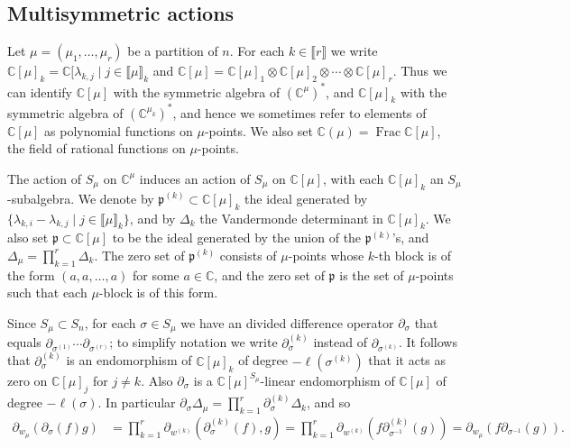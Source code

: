 \documentclass[11pt,fleqn]{article}
\newcommand\CC{\mathbb C}
\newcommand\ot{\otimes}
\newcommand\p{\mathfrak p}
\newcommand\interval[1]{\llbracket #1 \rrbracket}
\DeclareMathOperator\Frac{Frac}
\begin{document}
\subsection{Multisymmetric actions}
Let $\mu = (\mu_1, \ldots, \mu_r)$ be a partition of $n$. For each $k \in 
\interval r$ we write $\CC[\mu]_k = \CC[\lambda_{k,j} \mid j \in \interval 
\mu_k$ and $\CC[\mu] = \CC[\mu]_1 \ot \CC[\mu]_2 \ot \cdots \ot \CC[\mu]_r$. 
Thus we can identify $\CC[\mu]$ with the symmetric algebra of $(\CC^\mu)^*$, 
and $\CC[\mu]_k$ with the symmetric algebra of $(\CC^{\mu_k})^*$, and hence we 
sometimes refer to elements of $\CC[\mu]$ as polynomial functions on 
$\mu$-points. We also set $\CC(\mu) = \Frac \CC[\mu]$, the field of rational
functions on $\mu$-points.

The action of $S_\mu$ on $\CC^\mu$ induces an action of $S_\mu$ on $\CC[\mu]$, 
with each $\CC[\mu]_k$ an $S_\mu$-subalgebra. We denote by $\p^{(k)} \subset 
\CC[\mu]_k$ the ideal generated by $\{\lambda_{k,i} - \lambda_{k,j} \mid 
j \in \interval \mu_k\}$, and by $\Delta_k$ the Vandermonde determinant in 
$\CC[\mu]_k$. We also set $\p \subset \CC[\mu]$ to be the ideal generated by 
the union of the $\p^{(k)}$'s, and $\Delta_\mu = \prod_{k=1}^r \Delta_k$. The 
zero set of $\p^{(k)}$ consists of $\mu$-points whose $k$-th block is of the 
form $(a,a, \ldots, a)$ for some $a \in \CC$, and the zero set of $\p$ is the 
set of $\mu$-points such that each $\mu$-block is of this form. 

Since $S_\mu \subset S_n$, for each $\sigma \in S_\mu$ we have an divided 
difference operator $\partial_\sigma$ that equals $\partial_{\sigma^{(1)}} 
\cdots \partial_{\sigma^{(r)}}$; to simplify notation we write 
$\partial_\sigma^{(k)}$ instead of $\partial_{\sigma^{(k)}}$. It follows that 
$\partial_\sigma^{(k)}$ is an endomorphism of $\CC[\mu]_k$ of degree 
$-\ell(\sigma^{(k)})$ that it acts as zero on $\CC[\mu]_j$ for $j \neq k$. 
Also $\partial_\sigma$ is a $\CC[\mu]^{S_\mu}$-linear endomorphism of 
$\CC[\mu]$ of degree $-\ell(\sigma)$. In particular $\partial_\sigma 
\Delta_\mu = \prod_{k=1}^r \partial_{\sigma}^{(k)} \Delta_k$, and so 
\begin{align*}
\partial_{w_\mu}(\partial_\sigma(f) g) 
  &= \prod_{k=1}^r \partial_{w^{(k)}} (\partial_{\sigma}^{(k)}(f), g)
  = \prod_{k=1}^r \partial_{w^{(k)}} (f \partial_{\sigma^{-1}}^{(k)}(g)) 
  = \partial_{w_\mu} (f \partial_{\sigma^{-1}}(g)). 
\end{align*}
\end{document}

